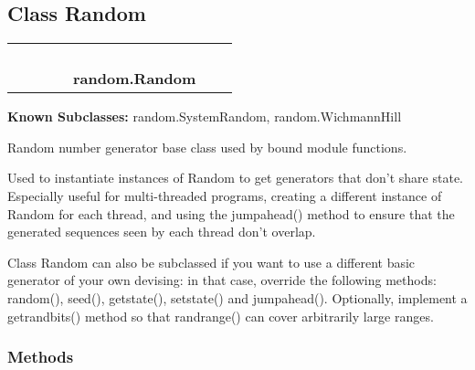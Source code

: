 
\subsection{Class Random}

    \label{random:Random}
\begin{tabular}{cccccccc}
\multicolumn{2}{r}{\settowidth{\BCL}{object}\multirow{2}{\BCL}{object}}
&&
&&
  \\\cline{3-3}
  &&\multicolumn{1}{c|}{}
&&
&&
  \\
\multicolumn{4}{r}{\settowidth{\BCL}{\_random.Random}\multirow{2}{\BCL}{\_random.Random}}
&&
  \\\cline{5-5}
  &&&&\multicolumn{1}{c|}{}
&&
  \\
&&&&\multicolumn{2}{l}{\textbf{random.Random}}
\end{tabular}

\textbf{Known Subclasses:}
random.SystemRandom,
    random.WichmannHill

Random number generator base class used by bound module functions.

Used to instantiate instances of Random to get generators that don't share 
state.  Especially useful for multi-threaded programs, creating a different
instance of Random for each thread, and using the jumpahead() method to 
ensure that the generated sequences seen by each thread don't overlap.

Class Random can also be subclassed if you want to use a different basic 
generator of your own devising: in that case, override the following 
methods: random(), seed(), getstate(), setstate() and jumpahead(). 
Optionally, implement a getrandbits() method so that randrange() can cover 
arbitrarily large ranges.



  \subsubsection{Methods}

